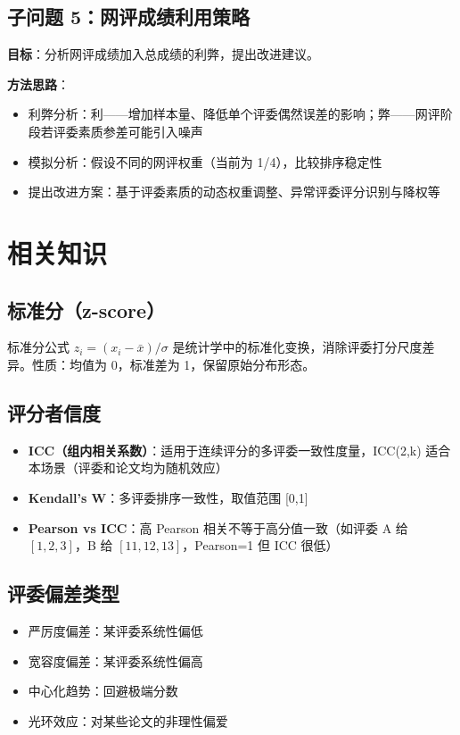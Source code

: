 \documentclass[UTF8]{ctexart}
\begin{document}
\subsection{子问题 5：网评成绩利用策略}

\textbf{目标}：分析网评成绩加入总成绩的利弊，提出改进建议。

\textbf{方法思路}：
\begin{itemize}
    \item 利弊分析：利——增加样本量、降低单个评委偶然误差的影响；弊——网评阶段若评委素质参差可能引入噪声
    \item 模拟分析：假设不同的网评权重（当前为 1/4），比较排序稳定性
    \item 提出改进方案：基于评委素质的动态权重调整、异常评委评分识别与降权等
\end{itemize}

\section{相关知识}

\subsection{标准分（z-score）}

标准分公式 $z_i = (x_i - \bar{x})/\sigma$ 是统计学中的标准化变换，消除评委打分尺度差异。性质：均值为 0，标准差为 1，保留原始分布形态。

\subsection{评分者信度}

\begin{itemize}
    \item \textbf{ICC（组内相关系数）}：适用于连续评分的多评委一致性度量，ICC(2,k) 适合本场景（评委和论文均为随机效应）
    \item \textbf{Kendall's W}：多评委排序一致性，取值范围 [0,1]
    \item \textbf{Pearson vs ICC}：高 Pearson 相关不等于高分值一致（如评委 A 给 $[1,2,3]$，B 给 $[11,12,13]$，Pearson=1 但 ICC 很低）
\end{itemize}

\subsection{评委偏差类型}

\begin{itemize}
    \item 严厉度偏差：某评委系统性偏低
    \item 宽容度偏差：某评委系统性偏高
    \item 中心化趋势：回避极端分数
    \item 光环效应：对某些论文的非理性偏爱
\end{itemize}
\end{document}
